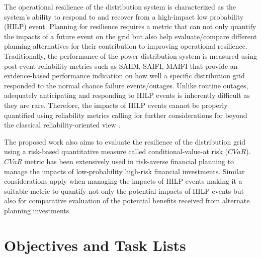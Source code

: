 \documentclass[12pt]{article}
\begin{document}
  The operational resilience of the distribution system is characterized as the system's ability to respond to and recover from a high-impact low probability (HILP) event. Planning for resilience requires a metric that can not only quantify the impacts of a future event on the grid but also help evaluate/compare different planning alternatives for their contribution to improving operational resilience.  Traditionally, the performance of the power distribution system is measured using post-event reliability metrics such as SAIDI, SAIFI, MAIFI that provide an evidence-based performance indication on how well a specific distribution grid responded to the normal chance failure events/outages. Unlike routine outages, adequately anticipating and responding to HILP events is inherently difficult as they are rare. Therefore, the impacts of HILP events cannot be properly quantified using reliability metrics calling for further considerations for beyond the classical reliability-oriented view \cite{panteli2015grid}. 
  
  The proposed work also aims to evaluate the resilience of the distribution grid using a risk-based quantitative measure called conditional-value-at risk ($CVaR$). $CVaR$ metric has been extensively used in risk-averse financial planning to manage the impacts of low-probability high-risk financial investments. Similar considerations apply when managing the impacts of HILP events making it a suitable metric to quantify not only the potential impacts of HILP events but also for comparative evaluation of the potential benefits received from alternate planning investments.
 
\section{Objectives and Task Lists}
\end{document}
